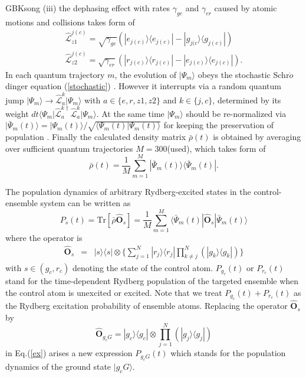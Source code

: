 \documentclass{cpbtex}
\begin{document}
\begin{CJK*}{GBK}{song}
(iii) the dephasing effect with rates $\gamma_{ge}$ and $\gamma_{er}$ caused by atomic motions and collisions takes form of
\begin{eqnarray}
\hat{{\mathcal{L}}}_{z1}^{j(c)}=\sqrt{\gamma_{ge}}(|e_{j(c)}\rangle\langle e_{j(c)}|-|g_{j(c}\rangle\langle g_{j(c)}|)   \nonumber\\
\hat{{\mathcal{L}}}_{z2}^{j(c)}=\sqrt{\gamma_{er}}(|r_{j(c)}\rangle\langle r_{j(c)}|-|e_{j(c)}\rangle\langle e_{j(c)}|).
\end{eqnarray}
In each quantum trajectory $m$, the evolution of $|\Psi_m\rangle$ obeys the stochastic Schr$\ddot{o}$dinger equation (\ref{stochastic}) \cite{PhysRevA.85.063822}. However it interrupts via a random quantum jump $\vert \Psi_m\rangle \to \hat{\mathcal{L}}_{a}^{k}\vert \Psi_m\rangle$ with $a\in\{e,r,z1,z2\}$ and $k\in\{j,c\}$, determined by its weight $dt \langle\Psi_m\vert\hat{\mathcal{L}}_{a}^{k\dagger}\hat{\mathcal{L}}_{a}^{k}\vert\Psi_m\rangle$. At the same time $|\Psi_m\rangle$ should be re-normalized via $\vert\bar{\Psi}_m(t)\rangle=\vert\Psi_m(t)\rangle/\sqrt{\langle\Psi_m(t)\vert\Psi_m(t)\rangle}$ for keeping the preservation of population \cite{PhysRevLett.108.023602}. Finally the calculated density matrix $\bar{\rho}(t)$ is obtained by averaging over sufficient quantum trajectories $M=300$(used), which takes form of
\begin{equation}
  \bar{\mathcal{\rho}}(t)=\frac{1}{M}\sum^{M}_{m=1}|\bar{\Psi}_m(t)\rangle\langle\bar{\Psi}_m(t)|.
\end{equation}










The population dynamics of arbitrary Rydberg-excited states in the control-ensemble system can be written as 
\begin{equation}
  P_{s}(t)=\text{Tr}[\bar{\rho}\hat{\mathbf{O}}_{s}]=\frac{1}{M}\sum_{m=1}^M\langle\bar{\Psi}_m(t)|\hat{\mathbf{O}}_{s}|\bar{\Psi}_m(t)\rangle 
  \label{ex}
\end{equation}
where the operator is
\begin{eqnarray}
  \hat{\mathbf{O}}_{s} &=& |s\rangle\langle s|\otimes\{\sum_{j=1}^{N}|r_j\rangle\langle r_j|\prod_{k\neq j}^{N}(|g_k\rangle\langle g_k|)\}
\end{eqnarray}
with $s\in(g_c,r_c)$ denoting the state of the control atom. $P_{g_c}(t)$ or $P_{r_c}(t)$ stand for the time-dependent Rydberg population of the targeted ensemble when the control atom is unexcited or excited. Note that we treat $P_{g_c}(t)+P_{r_c}(t)$ as the Rydberg excitation probability of ensemble atoms. Replacing the operator $\hat{\mathbf{O}}_{s}$ by
\begin{equation}
 \hat{\mathbf{O}}_{g_cG} = |g_c\rangle\langle g_c|\otimes\prod_{j=1}^{N}(|g_j\rangle\langle g_j|)  
\end{equation}
in Eq.(\ref{ex}) arises a new expression $P_{g_cG}(t)$ which stands for the population dynamics of the ground state $|g_cG\rangle$.


\end{CJK*}
\end{document}
